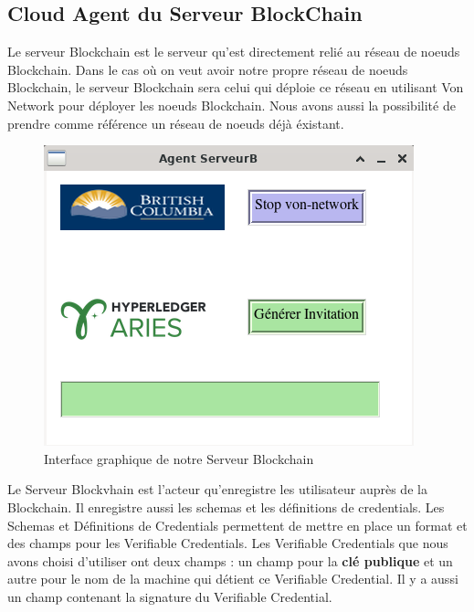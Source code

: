 \documentclass[12pt, openany]{report}
\begin{document}
\subsection{Cloud Agent du Serveur BlockChain}
\noindent 
\begin{flushleft}
Le serveur Blockchain est le serveur qu'est directement relié au réseau de noeuds Blockchain.  Dans le cas où on veut avoir notre propre réseau de noeuds Blockchain, le serveur Blockchain sera celui qui déploie ce réseau en utilisant Von Network pour déployer les noeuds Blockchain. Nous avons aussi la possibilité de prendre comme référence un réseau de noeuds déjà éxistant. \\

\begin{figure}[h]
\vspace{2mm}
\includegraphics[scale=0.7]{serveurB.png}
\centering
\caption{Interface graphique de notre Serveur Blockchain}
\end{figure}

Le Serveur Blockvhain est l'acteur qu'enregistre les utilisateur auprès de la Blockchain. Il enregistre aussi les schemas et les définitions de credentials. Les Schemas et Définitions de Credentials permettent de mettre en place un format et des champs pour les Verifiable Credentials. Les Verifiable Credentials que nous avons choisi d'utiliser ont deux champs : un champ pour la \textbf{clé publique} et un autre pour le nom de la machine qui détient ce Verifiable Credential. Il y a aussi un champ contenant la signature du Verifiable Credential.\\


\end{flushleft}
\end{document}
